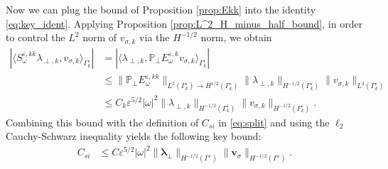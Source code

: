 \documentclass[]{article}
\numberwithin{equation}{section}
\numberwithin{theorem}{section}
\numberwithin{lemma}{section}
\numberwithin{corollary}{section}
\numberwithin{proposition}{section}
\numberwithin{definition}{section}
\newcommand{\re}{\varepsilon}
\renewcommand{\vec}{\boldsymbol}
\begin{document}
	Now we can plug the bound of Proposition \ref{prop:Ekk} into the identity \eqref{eq:key_ident}. Applying Proposition \ref{prop:L^2_H_minus_half_bound}, in order to control the $L^2$ norm of $v_{\sigma, k}$ via the $H^{-1/2}$ norm, we obtain 
	\begin{align*}%
		|\langle S^{\re,kk}_{\omega} \lambda_{\perp, k}, v_{\sigma, k} \rangle_{\Gamma^{\re}_k}| &= |\langle \lambda_{\perp,k}, \mathbb{P}_{\perp} E^{\re,k}_{\omega} v_{\sigma, k} \rangle_{\Gamma^{\re}_k}|  \\
		&\leq \| \mathbb{P}_{\perp} E^{\re,kk}_{\omega} \|_{L^2(\Gamma^{\re}_k) \rightarrow H^{1/2}(\Gamma^{\re}_k)} \| \lambda_{\perp, k} \|_{H^{-1/2}(\Gamma^{\re}_k)} \| v_{\sigma, k} \|_{L^2(\Gamma^{\re}_k)} \\
		&\leq C_k \re^{5/2} |\omega|^2  \| \lambda_{\perp, k} \|_{H^{-1/2}(\Gamma^{\re}_k)} \| v_{\sigma, k} \|_{H^{-1/2}(\Gamma^{\re}_k)}.
	\end{align*}
	Combining this bound with the definition of $C_{si}$ in \eqref{eq:split} and using the $\ell_2$ Cauchy-Schwarz inequality yields the following key bound: 
	\begin{align}
		\label{eq:Csi}
		C_{si} &\leq C\re^{5/2}|\omega|^2 \|\vec{\lambda}_{\perp}\|_{H^{-1/2}(\Gamma^{\re})}\|\vec{v}_{\sigma}\|_{H^{-1/2}(\Gamma^{\re})}.
	\end{align}
\end{document}
